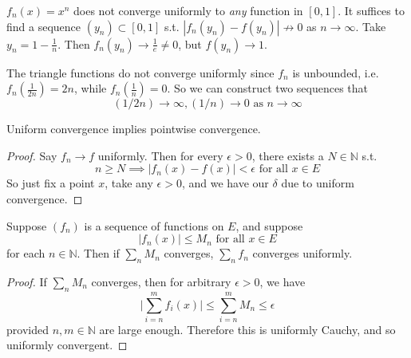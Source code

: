   \begin{example}
    $f_n (x) = x^n$ does not converge uniformly to \textit{any} function in $[0, 1]$. It suffices to find a sequence $(y_n) \subset [0, 1]$ s.t. $|f_n (y_n) - f(y_n)| \not\to 0$ as $n \to \infty$. Take $y_n = 1 - \frac{1}{n}$. Then $f_n (y_n) \to \frac{1}{e} \neq 0$, but $f(y_n) \to 1$. 
  \end{example}

  \begin{example}
    The triangle functions do not converge uniformly since $f_n$ is unbounded, i.e. $f_n (\frac{1}{2n}) = 2n$, while $f_n ( \frac{1}{n}) = 0$. So we can construct two sequences that  
    \begin{equation}
      (1/2n) \to \infty, (1/n) \to 0 \text{ as } n \to \infty
    \end{equation}
  \end{example}

  \begin{lemma}
    Uniform convergence implies pointwise convergence. 
  \end{lemma}
  \begin{proof}
    Say $f_n \to f$ uniformly. Then for every $\epsilon > 0$, there exists a $N \in \mathbb{N}$ s.t. 
    \begin{equation}
      n \geq N \implies |f_n (x) - f(x)| < \epsilon \text{ for all } x \in E
    \end{equation}
    So just fix a point $x$, take any $\epsilon > 0$, and we have our $\delta$ due to uniform convergence. 
  \end{proof}

  \begin{theorem}
    Suppose $(f_n)$ is a sequence of functions on $E$, and suppose 
    \begin{equation}
      |f_n (x)| \leq M_n \text{ for all } x \in E
    \end{equation}
    for each $n \in \mathbb{N}$. Then if $\sum_n M_n$ converges, $\sum_n f_n$ converges uniformly.  
  \end{theorem}
  \begin{proof}
    If $\sum_n M_n$ converges, then for arbitrary $\epsilon > 0$, we have 
    \begin{equation}
      \bigg| \sum_{i=n}^m f_i (x) \bigg| \leq \sum_{i = n}^m M_n \leq \epsilon
    \end{equation}
    provided $n, m \in \mathbb{N}$ are large enough. Therefore this is uniformly Cauchy, and so uniformly convergent. 
  \end{proof} 

